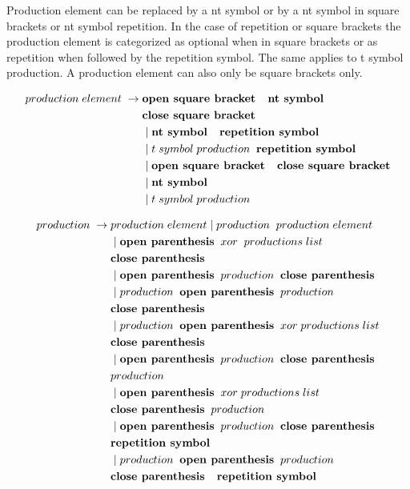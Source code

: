 Production element can be replaced by a nt symbol or by a nt symbol in square brackets or nt symbol repetition. In the case of repetition or square brackets the production element is categorized as optional when in square brackets or as repetition when followed by the repetition symbol. The same applies to t symbol production. A production element can also only be square brackets only.

 

\begin{align*}
	production\;element\; \rightarrow\; & \textbf{open square bracket \; nt symbol} \\ 
			   &\textbf{close square bracket}\\
               &\mid \textbf{nt symbol \; repetition symbol} \\
               &\mid t\;symbol\;production\;\; \textbf{repetition symbol} \\
               &\mid \textbf{open square bracket \; close square bracket} \\
               &\mid \textbf{nt symbol} \\
               &\mid t\; symbol\; production 
\end{align*}




\begin{align*}
	production\; \rightarrow\; &production\; element
                \mid production\;\; production\; element \\
               &\mid \textbf{open parenthesis}\;\; xor\; \;productions\; list\;\; \\
               &\textbf{close parenthesis} \\
               &\mid \textbf{open parenthesis}\;\; production\;\; \textbf{close parenthesis} \\
               &\mid production \;\;\textbf{open parenthesis}\;\; production \\
               &\textbf{close parenthesis} \\
               &\mid production\;\; \textbf{open parenthesis} \;\;xor \;productions\; list\\
               &\textbf{close parenthesis} \\
               &\mid \textbf{open parenthesis} \;\;production \;\;\textbf{close parenthesis} \\
               &production \\
               &\mid \textbf{open parenthesis}\;\; xor\; productions\; list\\ 
               &\textbf{close parenthesis}\;\; production \\
               &\mid \textbf{open parenthesis}\;\; production\;\; \textbf{close parenthesis} \\
               &\textbf{repetition symbol}\\
               &\mid production\;\; \textbf{open parenthesis} \;\;production \\
               &\textbf{close parenthesis \; repetition symbol}
\end{align*}


